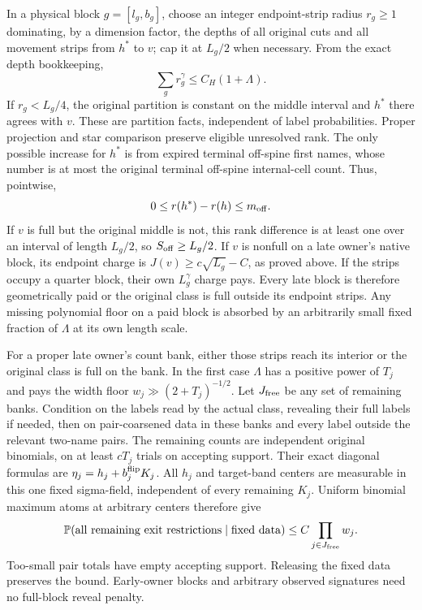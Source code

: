In a physical block $g=[l_g,b_g]$, choose an integer endpoint-strip
radius $r_g\ge1$ dominating, by a dimension factor, the depths of
all original cuts and all movement strips from $h^*$ to $v$; cap it
at $L_g/2$ when necessary. From the exact depth bookkeeping,
\begin{equation}
 \sum_gr_g^\gamma\le C_H(1+\Lambda).
 \label{history:strip-budget}
\end{equation}
If $r_g<L_g/4$, the original partition is constant on the middle
interval and $h^*$ there agrees with $v$. These are partition facts,
independent of label probabilities. Proper projection and star
comparison preserve eligible unresolved rank. The only possible
increase for $h^*$ is from expired terminal off-spine first names,
whose number is at most the original terminal off-spine internal-cell
count. Thus, pointwise,
\[
 0\le r(h^*)-r(h)\le m_{\rm off}.
\]
If $v$ is full but the original middle is not, this rank difference
is at least one over an interval of length $L_g/2$, so
$S_{\rm off}\ge L_g/2$. If $v$ is nonfull on a late owner's native
block, its endpoint charge is $J(v)\ge c\sqrt{L_g}-C$, as proved
above. If the strips occupy a quarter block, their own
$L_g^\gamma$ charge pays. Every late block is therefore geometrically
paid or the original class is full outside its endpoint strips.
Any missing polynomial floor on a paid block is absorbed by an
arbitrarily small fixed fraction of $\Lambda$ at its own length scale.

For a proper late owner's count bank, either those strips reach its
interior or the original class is full on the bank. In the first case
$\Lambda$ has a positive power of $T_j$ and pays the width floor
$w_j\gg(2+T_j)^{-1/2}$. Let $J_{\rm free}$ be any set of remaining
banks. Condition on the labels read by the actual class, revealing
their full labels if needed, then on pair-coarsened data in these banks
and every label outside the relevant two-name pairs. The remaining
counts are independent original binomials, on at least $cT_j$ trials
on accepting support. Their exact diagonal formulas are
$\eta_j=h_j+b_j^{\rm flip}K_j$.
All $h_j$ and target-band centers are measurable in this one fixed
sigma-field, independent of every remaining $K_j$. Uniform binomial
maximum atoms at arbitrary centers therefore give
\begin{equation}
 \mathbb P(\text{all remaining exit restrictions}\mid\text{fixed data})
                       \le C\prod_{j\in J_{\rm free}}w_j.
 \label{history:free-count-banks}
\end{equation}
Too-small pair totals have empty accepting support. Releasing the
fixed data preserves the bound. Early-owner blocks and arbitrary
observed signatures need no full-block reveal penalty.

